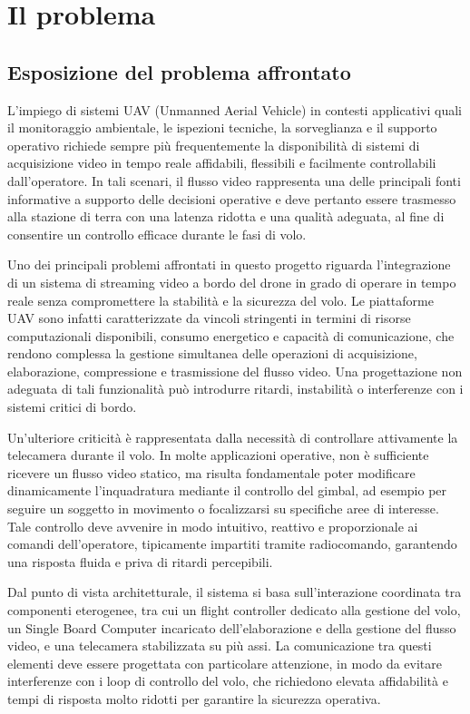 \chapter{Il problema}
\label{cap:problema}
\newpage



\section{Esposizione del problema affrontato}

L’impiego di sistemi UAV (Unmanned Aerial Vehicle) in contesti applicativi quali il monitoraggio ambientale, le ispezioni tecniche, la sorveglianza e il supporto operativo richiede sempre più frequentemente la disponibilità di sistemi di acquisizione video in tempo reale affidabili, flessibili e facilmente controllabili dall’operatore. In tali scenari, il flusso video rappresenta una delle principali fonti informative a supporto delle decisioni operative e deve pertanto essere trasmesso alla stazione di terra con una latenza ridotta e una qualità adeguata, al fine di consentire un controllo efficace durante le fasi di volo.

Uno dei principali problemi affrontati in questo progetto riguarda l’integrazione di un sistema di streaming video a bordo del drone in grado di operare in tempo reale senza compromettere la stabilità e la sicurezza del volo. Le piattaforme UAV sono infatti caratterizzate da vincoli stringenti in termini di risorse computazionali disponibili, consumo energetico e capacità di comunicazione, che rendono complessa la gestione simultanea delle operazioni di acquisizione, elaborazione, compressione e trasmissione del flusso video. Una progettazione non adeguata di tali funzionalità può introdurre ritardi, instabilità o interferenze con i sistemi critici di bordo.

Un’ulteriore criticità è rappresentata dalla necessità di controllare attivamente la telecamera durante il volo. In molte applicazioni operative, non è sufficiente ricevere un flusso video statico, ma risulta fondamentale poter modificare dinamicamente l’inquadratura mediante il controllo del gimbal, ad esempio per seguire un soggetto in movimento o focalizzarsi su specifiche aree di interesse. Tale controllo deve avvenire in modo intuitivo, reattivo e proporzionale ai comandi dell’operatore, tipicamente impartiti tramite radiocomando, garantendo una risposta fluida e priva di ritardi percepibili.

Dal punto di vista architetturale, il sistema si basa sull’interazione coordinata tra componenti eterogenee, tra cui un flight controller dedicato alla gestione del volo, un Single Board Computer incaricato dell’elaborazione e della gestione del flusso video, e una telecamera stabilizzata su più assi. La comunicazione tra questi elementi deve essere progettata con particolare attenzione, in modo da evitare interferenze con i loop di controllo del volo, che richiedono elevata affidabilità e tempi di risposta molto ridotti per garantire la sicurezza operativa.

